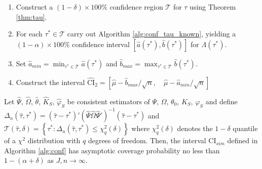 \begin{alg}[2-Step CI]
\label{alg:conf}
\mbox{}
\begin{enumerate}
  \item Construct a $(1-\delta)\times 100\%$ confidence region $\mathscr{T}$ for $\tau$ using Theorem \ref{thm:tau}. 
  \item For each $\tau^* \in \mathscr{T}$ carry out Algorithm \ref{alg:conf_tau_known}, yielding a $(1 - \alpha)\times 100\%$ confidence interval $\left[\widehat{a}(\tau^*),\widehat{b}(\tau^*)\right]$ for $\Lambda(\tau^*)$.  
	\item Set $\displaystyle \widehat{a}_{min}=\min_{\tau^* \in \mathscr{T}} \widehat{a}(\tau^*)$ and $\displaystyle \widehat{b}_{max}= \max_{\tau^* \in \mathscr{T}} \widehat{b}(\tau^*)$. 
	\item Construct the interval 
    $ \widehat{\mbox{CI}}_{2}=\left[ \widehat{\mu} - \widehat{b}_{max}/\sqrt{n}, \quad \widehat{\mu} - \widehat{a}_{min}/\sqrt{n} \right]$
\end{enumerate}
\end{alg}


\begin{thm}[2-Step CI]
\label{thm:sim}
Let $\widehat{\Psi}$, $\widehat{\Omega}$, $\widehat{\theta}$, $\widehat{K}_S$, $\widehat{\varphi}_S$ be consistent estimators of $\Psi$, $\Omega$, $\theta_0$, $K_S$, $\varphi_S$ and define 
$\Delta_n(\widehat{\tau},\tau^*) = \left(\widehat{\tau} - \tau^*\right)' (\widehat{\Psi}\widehat{\Omega}\widehat{\Psi}')^{-1} \left(\widehat{\tau} - \tau^*\right)$ 
and 
$\mathscr{T}(\widehat{\tau},\delta) = \left\{\tau^* \colon  \Delta_n(\widehat{\tau},\tau^*) \leq \chi^2_q(\delta)\right\}$
where $\chi^2_q(\delta)$ denotes the $1-\delta$ quantile of a $\chi^2$ distribution with $q$ degrees of freedom.
Then, the interval $\mbox{CI}_{sim}$ defined in Algorithm \ref{alg:conf} has asymptotic coverage probability no less than $1-(\alpha + \delta)$ as $J,n\rightarrow \infty$.
\end{thm}

